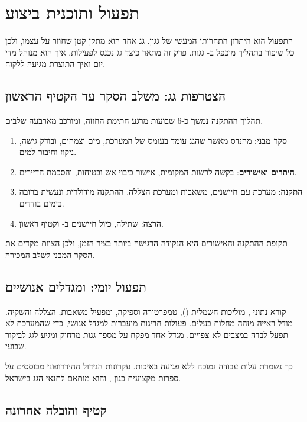 \chapter{תפעול ותוכנית ביצוע}\label{ch:operations}

התפעול הוא היתרון התחרותי המעשי של גגון. גג אחד הוא מתקן קטן שחוזר על עצמו, ולכן כל שיפור בתהליך מוכפל ב-\RRroofsFinal{} גגות. פרק זה מתאר כיצד גג נכנס לפעילות, איך הוא מנוהל מדי יום ואיך התוצרת מגיעה ללקוח.

\section{הצטרפות גג: משלב הסקר עד הקטיף הראשון}\label{sec:onboarding}

תהליך ההתקנה נמשך כ-6 שבועות מרגע חתימת החוזה, ומורכב מארבעה שלבים.

\begin{enumerate}
  \item \textbf{סקר מבני}: מהנדס מאשר שהגג עומד בעומס של המערכת, מים וצמחים, ובודק גישה, ניקוז וחיבור למים.
  \item \textbf{היתרים ואישורים}: בקשה לרשות המקומית, אישור כיבוי אש ובטיחות, והסכמת הדיירים.
  \item \textbf{התקנה}: מערכת  עם חיישנים, משאבות ומערכת הצללה. ההתקנה מודולרית ונעשית ברובה בימים בודדים.
  \item \textbf{הרצה}: שתילה, כיול חיישנים ב- וקטיף ראשון.
\end{enumerate}

תקופת ההתקנה והאישורים היא הנקודה הרגישה ביותר בציר הזמן, ולכן הצוות מקדים את הסקר המבני לשלב המכירה.

\section{תפעול יומי:  ומגדלים אנושיים}\label{sec:daily}

 קורא נתוני , מוליכות חשמלית (), טמפרטורה וספיקה, ומפעיל משאבות, הצללה והשקיה. מודל ראייה מזהה מחלות בעלים. פעולות חריגות מועברות למגדל אנושי, כדי שהמערכת לא תפעל לבדה במצבים לא צפויים. מגדל אחד מפקח על מספר גגות מרחוק ומגיע לגג לביקור שבועי.

כך נשמרת עלות עבודה נמוכה ללא פגיעה באיכות. עקרונות הגידול ההידרופוני מבוססים על ספרות מקצועית כגון \cite{resh2012}, והוא מותאם לתנאי הגג בישראל.

\section{קטיף והובלה אחרונה}\label{sec:logistics}


